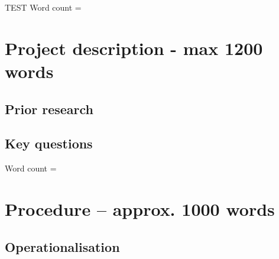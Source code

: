 \documentclass[12pt,a4paper]{article}
\begin{document}
TEST
Word count = 

\section{Project description \textmd{- max 1200 words}}
\subsection{Prior research}
%

\cite{barrett2006}

\subsection{Key questions}


Word count = 

\section{Procedure \textmd{– approx. 1000 words}}
\subsection{Operationalisation}
\end{document}
